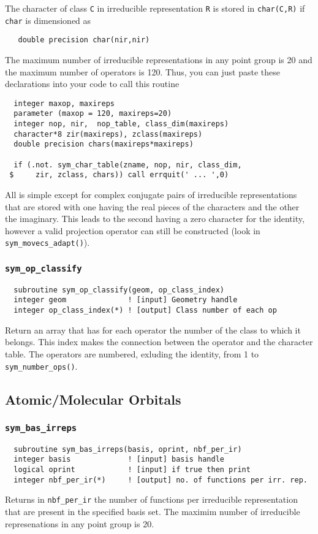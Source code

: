 The character of class \verb+C+ in irreducible representation \verb+R+
is stored in \verb+char(C,R)+ if \verb+char+ is dimensioned as
\begin{verbatim}
   double precision char(nir,nir)
\end{verbatim}
The maximum number of irreducible representations in any point group
is 20 and the maximum number of operators is 120.  Thus, you can just
paste these declarations into your code to call this routine
\begin{verbatim}
  integer maxop, maxireps     
  parameter (maxop = 120, maxireps=20)
  integer nop, nir,  nop_table, class_dim(maxireps)
  character*8 zir(maxireps), zclass(maxireps)
  double precision chars(maxireps*maxireps)

  if (.not. sym_char_table(zname, nop, nir, class_dim,
 $     zir, zclass, chars)) call errquit(' ... ',0)
\end{verbatim}

All is simple except for complex conjugate pairs of irreducible
representations that are stored with one having the real pieces of the
characters and the other the imaginary.  This leads to the second
having a zero character for the identity, however a valid projection
operator can still be constructed (look in \verb+sym_movecs_adapt()+).

\subsubsection{{\tt sym\_op\_classify}}
\begin{verbatim}
  subroutine sym_op_classify(geom, op_class_index)
  integer geom              ! [input] Geometry handle
  integer op_class_index(*) ! [output] Class number of each op
\end{verbatim}
Return an array that has for each operator the number of the class to
which it belongs.  This index makes the connection between the
operator and the character table.  The operators are numbered,
exluding the identity, from 1 to \verb+sym_number_ops()+.

\subsection{Atomic/Molecular Orbitals}

\subsubsection{{\tt sym\_bas\_irreps}}
\begin{verbatim}
  subroutine sym_bas_irreps(basis, oprint, nbf_per_ir)
  integer basis             ! [input] basis handle
  logical oprint            ! [input] if true then print
  integer nbf_per_ir(*)     ! [output] no. of functions per irr. rep.
\end{verbatim}
Returns in \verb+nbf_per_ir+ the number of functions per irreducible
representation that are present in the specified basis set.  The
maximim number of irreducible represenations in any point group is 20.

